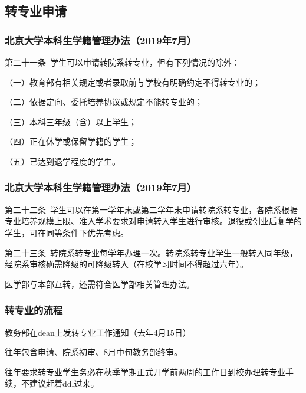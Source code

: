\documentclass[12pt,AutoFakeBold]{beamer}
\begin{document}
    \subsection{转专业申请}
    \begin{frame}
        \frametitle{北京大学本科生学籍管理办法（2019年7月）}
        第二十一条\  学生可以申请转院系转专业，但有下列情况的除外：

        （一）教育部有相关规定或者录取前与学校有明确约定不得转专业的；

        （二）依据定向、委托培养协议或规定不能转专业的；

        （三）本科三年级（含）以上学生；

        （四）正在休学或保留学籍的学生；

        （五）已达到退学程度的学生。
    \end{frame}
    \begin{frame}
        \frametitle{北京大学本科生学籍管理办法（2019年7月）}
        第二十二条\ 学生可以在第一学年末或第二学年末申请转院系转专业，各院系根据专业培养规模上限、准入学术要求对申请转入学生进行审核。退役或创业后复学的学生，可在同等条件下优先考虑。

        第二十三条\ 转院系转专业每学年办理一次。转院系转专业学生一般转入同年级，经院系审核确需降级的可降级转入（在校学习时间不得超过六年）。

        医学部与本部互转，还需符合医学部相关管理办法。
    \end{frame}
    \begin{frame}
        \frametitle{转专业的流程}
        教务部在dean上发转专业工作通知（去年4月15日）

        往年包含申请、院系初审、8月中旬教务部终审。

        往年要求转专业学生\alert{务必}在秋季学期正式开学前\alert{两周的工作日}到校办理转专业手续，不建议赶着ddl过来。
    \end{frame}
\end{document}
